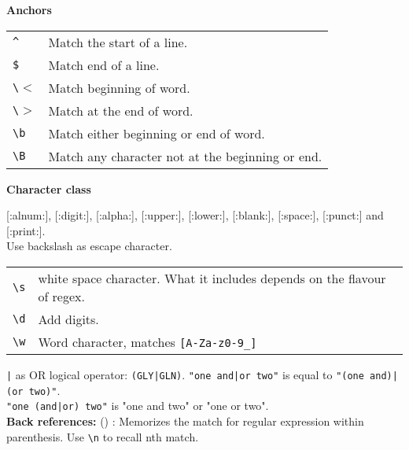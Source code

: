 \textbf{Anchors}

\begin{tabularx}{\linewidth}{lX}

\texttt{\^{}} & Match the start of a line.\\
\texttt{\$} & Match end of a line.\\
\texttt{\textbackslash $<$} & Match beginning of word.\\
\texttt{\textbackslash $>$} & Match at the end of word.\\
\texttt{\textbackslash b} & Match either beginning or end of word.\\
\texttt{\textbackslash B} & Match any character not at the beginning or end. \\

\hline

\end{tabularx}

\textbf{Character class}

[:alnum:], [:digit:], [:alpha:], [:upper:], [:lower:], [:blank:], [:space:], [:punct:] and [:print:].\\

Use backslash as escape character. \\
\begin{tabularx}{\linewidth}{lX}
\texttt{\textbackslash s} & white space character. What it includes depends on the flavour of regex.\\
\texttt{\textbackslash d} & Add digits.\\
\texttt{\textbackslash w} & Word character, matches \texttt{[A-Za-z0-9\_]}\\
\end{tabularx}
\texttt{|} as OR logical operator: \texttt{(GLY|GLN)}.
\texttt{"one and|or two"} is equal to \texttt{"(one and)|(or two)"}.\\
\texttt{"one (and|or) two"} is "one and two" or "one or two".\\

\textbf{Back references:} () : Memorizes the match for regular expression within parenthesis. Use \texttt{\textbackslash n} to recall nth match.

\begin{tabularx}{\linewidth}{lX}
\hline
\end{tabularx}

\vfill\null
\columnbreak

